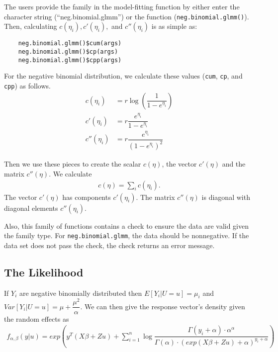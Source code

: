 \documentclass{article}
\begin{document}
    The users provide the family in the model-fitting function by either enter the character string (``neg.binomial.glmm'') or the function (\texttt{neg.binomial.glmm()}). Then, calculating $c(\eta_i), c'(\eta_i),$ and  $c''(\eta_i)$ is as simple as: 
    \begin{verbatim}
    neg.binomial.glmm()$cum(args)
    neg.binomial.glmm()$cp(args)
    neg.binomial.glmm()$cpp(args)
    \end{verbatim}
    
    \noindent For the negative binomial distribution, we calculate these values (\texttt{cum}, \texttt{cp}, and \texttt{cpp}) as follows.
    \begin{align}
    c(\eta_i)&=r \log \left( \dfrac{1}{1-e^{\eta_i}} \right) \\
    c'(\eta_i)&= r \dfrac{e^{\eta_i}}{1-e^{\eta_i}} \\
    c''(\eta_i)&= r \dfrac{e^{\eta_i}}{ \left( 1- e^{\eta_i} \right) ^2}
    \end{align}
    
    \noindent Then we use these pieces to create the scalar $c(\eta)$, the vector $c'(\eta)$ and the matrix $c''(\eta)$. We calculate
    \begin{align}
    c(\eta)= \sum_i c(\eta_i).
    \end{align}
    The vector $c'(\eta)$ has components $c'(\eta_i)$. The matrix $c''(\eta)$ is diagonal with diagonal elements $c''(\eta_i)$.
    
    Also, this family of functions contains a check to ensure the data are valid given the family type. For \texttt{neg.binomial.glmm}, the data should be nonnegative.  If the data set does not pass the check, the check returns an error message. 
    
    \subsection{The Likelihood}
        If $Y_i$ are negative binomially distributed then $E[Y_i|U=u]=\mu_i$ and $Var[Y_i|U=u] = \mu + \dfrac{\mu^2}{\alpha}$. We can then give the response vector's density given the random effects as
        \begin{align}
        f_{\alpha,\beta}(y|u) = exp(y^T(X \beta + Z u) + \sum\limits_{i=1}^n \log \dfrac{\Gamma (y_i + \alpha) \cdot \alpha^\alpha}{\Gamma (\alpha) \cdot (exp(X \beta + Z u)+\alpha)^{y_i + \alpha}})
        \end{align}
\end{document}
